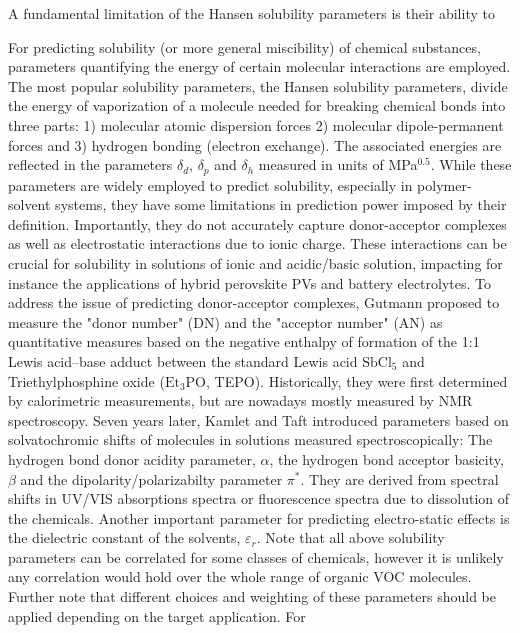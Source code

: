 \documentclass[
  english,        %
  font=times,     %
  onecolumn,      %
]{article}
\begin{document}
A fundamental limitation of the Hansen solubility parameters is their ability to



For predicting solubility (or more general miscibility) of chemical substances, parameters quantifying the energy of certain molecular interactions are employed\cite{bartonSolubilityParameters1975,vandykSolubilitySolvencySolubility1985,fernandesApplicationHansenSolubility2025}. The most popular solubility parameters, the Hansen solubility parameters\cite{hansenHansenSolubilityParameters2007}, divide the energy of vaporization of a molecule needed for breaking chemical bonds into three parts: 1) molecular atomic dispersion forces 2) molecular dipole-permanent forces and 3) hydrogen bonding (electron exchange). The associated energies are reflected in the parameters $\delta_d$, $\delta_p$ and $\delta_h$ measured in units of MPa$^{0.5}$. While these parameters are widely employed to predict solubility, especially in polymer-solvent systems\cite{vandertolSolventInducedPathwayComplexity2023,venkatramCriticalAssessmentHildebrand2019}, they have some limitations in prediction power imposed by their definition. Importantly, they do not accurately capture donor-acceptor complexes as well as electrostatic interactions due to ionic charge\cite{louwerseRevisitingHansenSolubility2017,kobayashiDeterminationHansenSolubility2020,holzweberMutualLewisAcid2013}. These interactions can be crucial for solubility in solutions of ionic and acidic/basic solution, impacting for instance the applications of hybrid perovskite PVs\cite{podapangiGreenSolventsMaterials2023} and battery electrolytes\cite{zhouUnderstandingApplyingDonor2024}. To address the issue of predicting donor-acceptor complexes, Gutmann proposed to measure the "donor number" (DN) and the "acceptor number" (AN) as quantitative measures based on the negative enthalpy of formation of the 1:1 Lewis acid–base adduct between the standard Lewis acid $\mathrm{  SbCl}_5$ and Triethylphosphine oxide ($\mathrm{Et_3PO}$, TEPO). Historically, they were first determined by calorimetric measurements, but are nowadays mostly measured by NMR spectroscopy\cite{gutmannEmpiricalParametersDonor1976}. Seven years later, Kamlet and Taft introduced parameters based on solvatochromic shifts of molecules in solutions measured spectroscopically\cite{kamletLinearSolvationEnergy1983}: The  hydrogen bond donor acidity parameter, $\alpha$, the hydrogen bond acceptor basicity, $\beta$ and the dipolarity/polarizabilty parameter $\pi^{*}$.  They are derived from spectral shifts in UV/VIS absorptions spectra or fluorescence spectra due to dissolution of the chemicals. Another important parameter for predicting electro-static effects is the dielectric constant of the solvents, $\varepsilon_r$. Note that all above solubility parameters can be correlated for some classes of chemicals\cite{lanComparingCorrelatingSolubility2014, parutaCorrelationSolubilityParameters1962, shiRelationshipHansenSolubility2007,waghorneSolventAcidityBasicity2024}, however it is unlikely any correlation would hold over the whole range of organic VOC molecules. Further note that different choices and weighting of these parameters should be applied depending on the target application. For 
\end{document}
